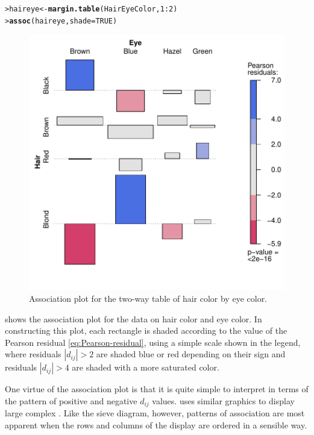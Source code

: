 \documentclass[10pt,krantz2]{krantz}\usepackage[]{graphicx}\usepackage[]{color}
\makeatletter
\newcommand{\hlnum}[1]{\textcolor[rgb]{0.686,0.059,0.569}{#1}}%
\newcommand{\hlopt}[1]{\textcolor[rgb]{0,0,0}{#1}}%
\newcommand{\hlstd}[1]{\textcolor[rgb]{0.345,0.345,0.345}{#1}}%
\newcommand{\hlkwb}[1]{\textcolor[rgb]{0.69,0.353,0.396}{#1}}%
\newcommand{\hlkwc}[1]{\textcolor[rgb]{0.333,0.667,0.333}{#1}}%
\newcommand{\hlkwd}[1]{\textcolor[rgb]{0.737,0.353,0.396}{\textbf{#1}}}%
\newenvironment{kframe}{%
 \def\at@end@of@kframe{}%
 \ifinner\ifhmode%
  \def\at@end@of@kframe{\end{minipage}}%
  \begin{minipage}{\columnwidth}%
 \fi\fi%
 \def\FrameCommand##1{\hskip\@totalleftmargin \hskip-\fboxsep
 \colorbox{shadecolor}{##1}\hskip-\fboxsep
     \hskip-\linewidth \hskip-\@totalleftmargin \hskip\columnwidth}%
 \MakeFramed {\advance\hsize-\width
   \@totalleftmargin\z@ \linewidth\hsize
   \@setminipage}}%
 {\par\unskip\endMakeFramed%
 \at@end@of@kframe}
\newenvironment{knitrout}{}{} %
\renewenvironment{knitrout}{\small\renewcommand{\baselinestretch}{.85}}{} %
\makeatother
\begin{document}
\begin{knitrout}
\color{fgcolor}\begin{kframe}
\begin{alltt}
\hlstd{> }\hlstd{haireye} \hlkwb{<-} \hlkwd{margin.table}\hlstd{(HairEyeColor,} \hlnum{1}\hlopt{:}\hlnum{2}\hlstd{)}
\hlstd{> }\hlkwd{assoc}\hlstd{(haireye,} \hlkwc{shade}\hlstd{=}\hlnum{TRUE}\hlstd{)}
\end{alltt}
\end{kframe}\begin{figure}[!htbp]

\centerline{\includegraphics[width=.6\textwidth]{ch04/fig/HE-assoc-1} }

\caption[Association plot for the two-way table of hair color by eye color]{Association plot for the two-way table of hair color by eye color.\label{fig:HE-assoc}}
\end{figure}


\end{knitrout}
 shows the association plot for the data on
hair color and eye color.
In constructing this plot, each rectangle is shaded according to
the value of the Pearson residual \eqref{eq:Pearson-residual},
using a simple scale shown in the legend, where residuals
$|d_{ij}| > 2$ are shaded blue or red depending on their sign
and residuals $|d_{ij}| > 4$
are shaded with a more saturated color.

One virtue of the association plot is that it is quite simple to
interpret in terms of the pattern of
positive and negative  $d_{ij}$ values.
\citet{Bertin:81} uses similar graphics to display large complex
\ctabs.  Like the sieve diagram, however, patterns of association
are most apparent when the rows and columns of the display are ordered
in a sensible way.
\end{document}
